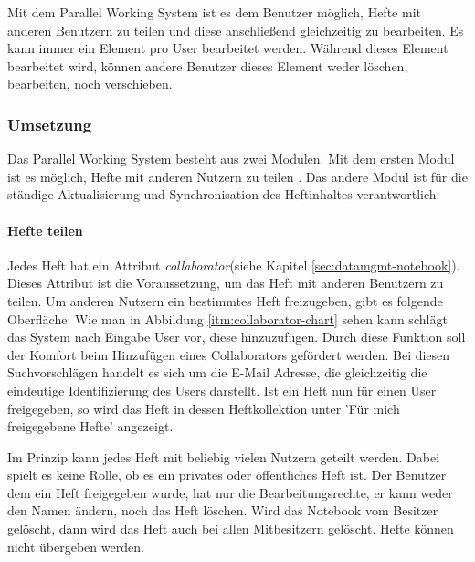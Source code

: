 Mit dem Parallel Working System ist es dem Benutzer möglich, Hefte mit anderen Benutzern zu teilen und diese anschließend gleichzeitig zu bearbeiten. Es kann immer ein Element pro User bearbeitet werden. Während dieses Element bearbeitet wird, können andere Benutzer dieses Element weder löschen, bearbeiten, noch verschieben. 

\subsubsection{Umsetzung}
Das Parallel Working System besteht aus zwei Modulen. Mit dem ersten Modul ist es möglich, Hefte mit anderen Nutzern zu teilen . Das andere Modul ist für die ständige Aktualisierung und Synchronisation des Heftinhaltes verantwortlich. 
\paragraph{Hefte teilen}
Jedes Heft hat ein Attribut \textit{collaborator}(siehe Kapitel \ref{sec:datamgmt-notebook}). Dieses Attribut ist die Voraussetzung, um das Heft mit anderen Benutzern zu teilen. 
Um anderen Nutzern ein bestimmtes Heft freizugeben, gibt es folgende Oberfläche:
Wie man in Abbildung \ref{itm:collaborator-chart} sehen kann schlägt das System nach Eingabe User vor, diese hinzuzufügen. Durch diese Funktion soll der Komfort beim Hinzufügen eines Collaborators gefördert werden. Bei diesen Suchvorschlägen handelt es sich um die E-Mail Adresse, die gleichzeitig die eindeutige Identifizierung des Users darstellt.
Ist ein Heft nun für einen User freigegeben, so wird das Heft in dessen Heftkollektion unter 'Für mich freigegebene Hefte' angezeigt. 


\newpage

Im Prinzip kann jedes Heft mit beliebig vielen Nutzern geteilt werden. Dabei spielt es keine Rolle, ob es ein privates oder öffentliches Heft ist. 
Der Benutzer dem ein Heft freigegeben wurde, hat nur die Bearbeitungsrechte, er kann weder den Namen ändern, noch das Heft löschen. Wird das Notebook vom Besitzer gelöscht, dann wird das Heft auch bei allen Mitbesitzern gelöscht. Hefte können nicht übergeben werden.

